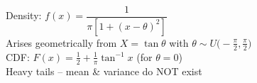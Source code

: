 \documentclass[preview]{standalone}
\begin{document}
Density: $f(x)=\dfrac{1}{\pi[1+(x-\theta)^2]}$\\Arises geometrically from $X=\tan\theta$ with $\theta\sim U\!\bigl(-\tfrac\pi2,\tfrac\pi2\bigr)$\\CDF: $F(x)=\tfrac12+\tfrac1\pi \tan^{-1}x$ (for $\theta=0$)\\Heavy tails – mean & variance do NOT exist\\
\end{document}
